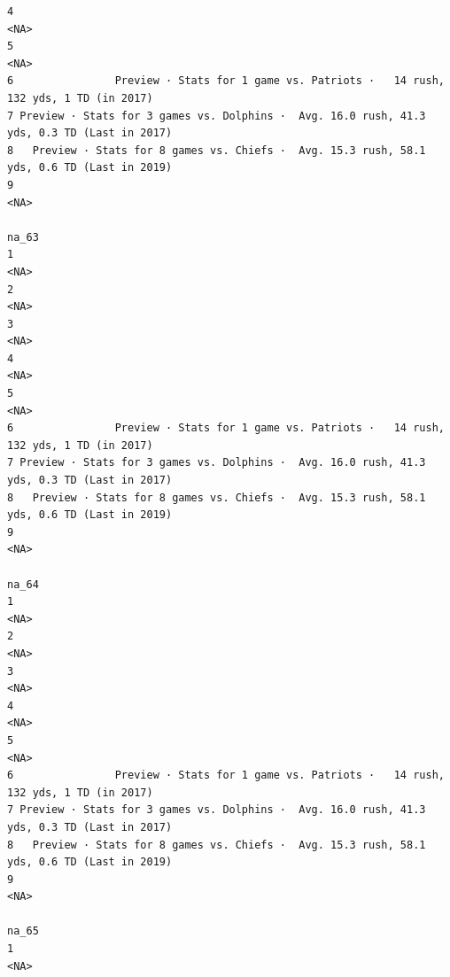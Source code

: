 \documentclass[
]{article}
\begin{document}
\begin{verbatim}
4                                                                                        <NA>
5                                                                                        <NA>
6                Preview · Stats for 1 game vs. Patriots ·   14 rush, 132 yds, 1 TD (in 2017)
7 Preview · Stats for 3 games vs. Dolphins ·  Avg. 16.0 rush, 41.3 yds, 0.3 TD (Last in 2017)
8   Preview · Stats for 8 games vs. Chiefs ·  Avg. 15.3 rush, 58.1 yds, 0.6 TD (Last in 2019)
9                                                                                        <NA>
                                                                                        na_63
1                                                                                        <NA>
2                                                                                        <NA>
3                                                                                        <NA>
4                                                                                        <NA>
5                                                                                        <NA>
6                Preview · Stats for 1 game vs. Patriots ·   14 rush, 132 yds, 1 TD (in 2017)
7 Preview · Stats for 3 games vs. Dolphins ·  Avg. 16.0 rush, 41.3 yds, 0.3 TD (Last in 2017)
8   Preview · Stats for 8 games vs. Chiefs ·  Avg. 15.3 rush, 58.1 yds, 0.6 TD (Last in 2019)
9                                                                                        <NA>
                                                                                        na_64
1                                                                                        <NA>
2                                                                                        <NA>
3                                                                                        <NA>
4                                                                                        <NA>
5                                                                                        <NA>
6                Preview · Stats for 1 game vs. Patriots ·   14 rush, 132 yds, 1 TD (in 2017)
7 Preview · Stats for 3 games vs. Dolphins ·  Avg. 16.0 rush, 41.3 yds, 0.3 TD (Last in 2017)
8   Preview · Stats for 8 games vs. Chiefs ·  Avg. 15.3 rush, 58.1 yds, 0.6 TD (Last in 2019)
9                                                                                        <NA>
                                                                                        na_65
1                                                                                        <NA>

\end{verbatim}
\end{document}
